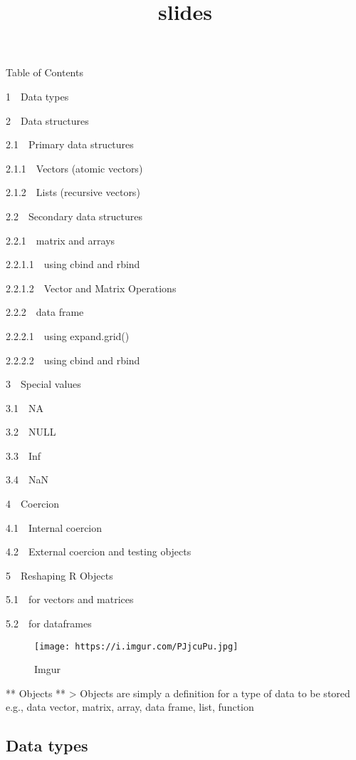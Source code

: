 \documentclass[11pt]{article}
\title{slides}
\makeatletter
\def\maxwidth{\ifdim\Gin@nat@width>\linewidth\linewidth
    \else\Gin@nat@width\fi}
\let\Oldincludegraphics\includegraphics
\renewcommand{\includegraphics}[1]{\Oldincludegraphics[width=.8\maxwidth]{#1}}
\makeatother
\begin{document}
    
    
    \maketitle
    
    

    
    Table of Contents{}

{{1~~}Data types}

{{2~~}Data structures}

{{2.1~~}Primary data structures}

{{2.1.1~~}Vectors (atomic vectors)}

{{2.1.2~~}Lists (recursive vectors)}

{{2.2~~}Secondary data structures}

{{2.2.1~~}matrix and arrays}

{{2.2.1.1~~}using cbind and rbind}

{{2.2.1.2~~}Vector and Matrix Operations}

{{2.2.2~~}data frame}

{{2.2.2.1~~}using expand.grid()}

{{2.2.2.2~~}using cbind and rbind}

{{3~~}Special values}

{{3.1~~}NA}

{{3.2~~}NULL}

{{3.3~~}Inf}

{{3.4~~}NaN}

{{4~~}Coercion}

{{4.1~~}Internal coercion}

{{4.2~~}External coercion and testing objects}

{{5~~}Reshaping R Objects}

{{5.1~~}for vectors and matrices}

{{5.2~~}for dataframes}

    \begin{figure}[htbp]
\centering
\texttt{[image: https://i.imgur.com/PJjcuPu.jpg]}
\caption{Imgur}
\end{figure}

    ** Objects ** \textgreater{} Objects are simply a definition for a type
of data to be stored\\
e.g., data vector, matrix, array, data frame, list, function

    \subsection{Data types}\label{data-types}
\end{document}
